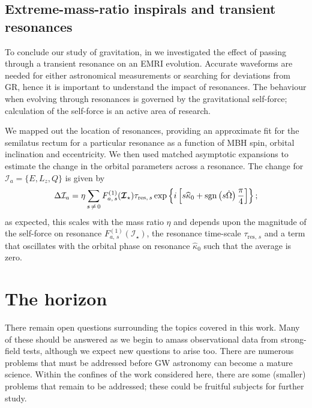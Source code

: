 \subsection{Extreme-mass-ratio inspirals and transient resonances}\label{sec:Review-resonances}

To conclude our study of gravitation, in  we investigated the effect of passing through a transient resonance on an EMRI evolution. Accurate waveforms are needed for either astronomical measurements or searching for deviations from GR, hence it is important to understand the impact of resonances. The behaviour when evolving through resonances is governed by the gravitational self-force; calculation of the self-force is an active area of research.

We mapped out the location of resonances, providing an approximate fit for the semilatus rectum for a particular resonance as a function of MBH spin, orbital inclination and eccentricity. We then used matched asymptotic expansions to estimate the change in the orbital parameters across a resonance. The change for $\mathcal{I}_a = \{E,L_z,Q\}$ is given by
\begin{equation}
\Delta \mathcal{I}_a = \eta\sum_{s\,\neq\,0}F_{a,\,s}^{(1)}(\boldsymbol{\mathcal{I}}_\star)\tau_{\mathrm{res},\,s}\exp\left\{i\left[s \widehat{\kappa}_0 +\operatorname{sgn}\left(s\dot{\Omega}\right)\dfrac{\pi}{4}\right]\right\};
\end{equation}
as expected, this scales with the mass ratio $\eta$ and depends upon the magnitude of the self-force on resonance $F_{a,\,s}^{(1)}(\boldsymbol{\mathcal{I}}_\star)$, the resonance time-scale $\tau_{\mathrm{res},\,s}$ and a term that oscillates with the orbital phase on resonance $\widehat{\kappa}_0$ such that the average is zero.

\section{The horizon}

There remain open questions surrounding the topics covered in this work. Many of these should be answered as we begin to amass observational data from strong-field tests, although we expect new questions to arise too. There are numerous problems that must be addressed before GW astronomy can become a mature science. Within the confines of the work considered here, there are some (smaller) problems that remain to be addressed; these could be fruitful subjects for further study.

